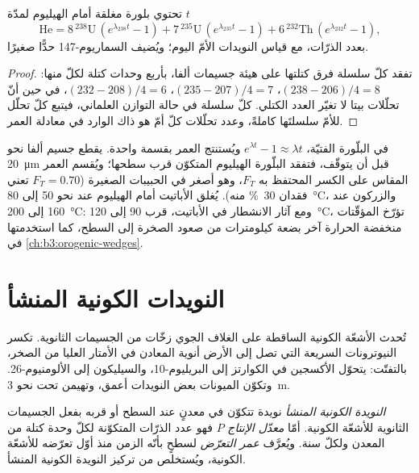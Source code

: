 \begin{theorem}\label{thm:b3:advanced-geochronology:helium}
تحتوي بلورة مغلقة أمام الهيليوم لمدّة $t$
\[
\mathrm{He} = 8\,{}^{238}\mathrm U\,(e^{\lambda_{238}t} - 1)
+ 7\,{}^{235}\mathrm U\,(e^{\lambda_{235}t} - 1)
+ 6\,{}^{232}\mathrm{Th}\,(e^{\lambda_{232}t} - 1),
\]
بعدد الذرّات، مع قياس النويدات الأمّ اليوم؛ ويُضيف السماريوم-147 حدًّا صغيرًا.
\end{theorem}

\begin{proof}
تفقد كلّ سلسلة فرق كتلتها على هيئة جسيمات ألفا، بأربع وحدات كتلة لكلّ منها:
$(238 - 206)/4 = 8$، $(235 - 207)/4 = 7$، $(232 - 208)/4 = 6$، في حين أنّ
تحلّلات بيتا لا تغيّر العدد الكتلي. كلّ سلسلة في حالة التوازن العلماني،
فيتبع كلّ تحلّل للأمّ سلسلتَها كاملةً، وعدد
تحلّلات كلّ أمّ هو ذاك الوارد في معادلة العمر.
\end{proof}

في البلّورة الفتيّة، $e^{\lambda t} - 1 \approx \lambda t$ ويُستنتج العمر
بقسمة واحدة. يقطع جسيم ألفا نحو
\qty{20}{\micro\metre} قبل أن يتوقّف، فتفقد البلّورة الهيليوم المتكوّن
قرب سطحها؛ ويُقسم العمر المقاس على الكسر المحتفظ به $F_T$،
وهو أصغر في الحبيبات الصغيرة ($F_T = 0.70$ تعني فقدان \qty{30}{\percent}
منه). يُغلق الأباتيت أمام الهيليوم عند نحو 50 إلى \qty{80}{\celsius}، والزركون عند
160 إلى \qty{200}{\celsius}: ومع آثار الانشطار في الأباتيت، قرب 90 إلى
\qty{120}{\celsius}، تؤرّخ المؤقّتات منخفضة الحرارة آخر
بضعة كيلومترات من صعود الصخرة إلى السطح، كما
استخدمتها في \cref{ch:b3:orogenic-wedges}.

\section{النويدات الكونية المنشأ}\label{sec:b3:advanced-geochronology:cosmogenic}

تُحدث الأشعّة الكونية الساقطة على الغلاف الجوي زخّات من الجسيمات الثانوية. تكسر
النيوترونات السريعة التي تصل إلى الأرض أنوية المعادن في الأمتار العليا من الصخر،
بالتفتّت: يتحوّل الأكسجين في الكوارتز إلى البريليوم-10، والسيليكون
إلى الألومنيوم-26. وتكوّن الميونات بعض النويدات أعمق، وتهيمن تحت نحو
\qty{3}{m}.

\begin{definition}
\label{def:b3:advanced-geochronology:cosmogenic}
\emph{النويدة الكونية المنشأ} نويدة تتكوّن في
معدنٍ عند السطح أو قربه بفعل الجسيمات الثانوية للأشعّة الكونية. أمّا
\emph{معدّل الإنتاج} $P$ فهو عدد
الذرّات المتكوّنة لكلّ وحدة كتلة من المعدن ولكلّ سنة. ويُعرَّف \emph{عمر
التعرّض} لسطحٍ بأنّه الزمن منذ أوّل تعرّضه
للأشعّة الكونية، ويُستخلص من تركيز النويدة الكونية المنشأ.
\end{definition}

